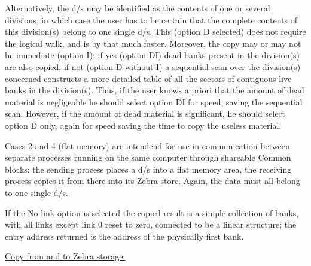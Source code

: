 Alternatively, the d/s may be identified as the contents
of one or several divisions,
in which case the user has to be certain that the complete contents
of this division(s) belong to one single d/s.
This (option D selected) does not require the logical walk,
and is by that much faster.
Moreover, the copy may or may not be immediate (option I):
if yes (option DI) dead banks present in the division(s) are
also copied, if not (option D without I) a sequential scan
over the division(s) concerned constructs a more detailed
table of all the sectors of contiguous live banks in the division(s).
Thus, if the user knows a priori that the amount of dead material
is negligeable he should select option DI for speed,
saving the sequential scan.
However, if the amount of dead material is significant,
he should select option D only,
again for speed saving the time to copy the useless material.

Cases 2 and 4 (flat memory) are intendend for use in communication
between separate processes running on the same computer
through shareable Common blocks:
the sending process places a d/s into a flat memory area,
the receiving process copies it from there into its Zebra store.
Again, the data must all belong to one single d/s.

If the No-link option is selected the copied result
is a simple collection of banks,
with all links except link 0 reset to zero,
connected to be a linear structure;
the entry address returned is the address of
the physically first bank.


\ul{\large Copy from and to Zebra storage:}

